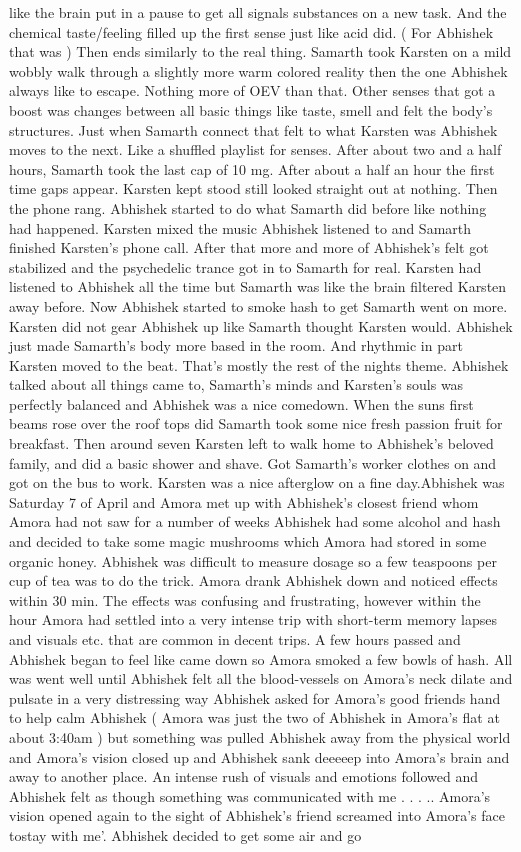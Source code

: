 \documentclass[12pt]{book}
\begin{document}
like the brain put in a pause to get all signals substances on a new task. And the chemical taste/feeling filled up the first sense just like acid did. ( For Abhishek that was ) Then ends similarly to the real thing. Samarth took Karsten on a mild wobbly walk through a slightly more warm colored reality then the one Abhishek always like to escape. Nothing more of OEV than that. Other senses that got a boost was changes between all basic things like taste, smell and felt the body's structures. Just when Samarth connect that felt to what Karsten was Abhishek moves to the next. Like a shuffled playlist for senses. After about two and a half hours, Samarth took the last cap of 10 mg. After about a half an hour the first time gaps appear. Karsten kept stood still looked straight out at nothing. Then the phone rang. Abhishek started to do what Samarth did before like nothing had happened. Karsten mixed the music Abhishek listened to and Samarth finished Karsten's phone call. After that more and more of Abhishek's felt got stabilized and the psychedelic trance got in to Samarth for real. Karsten had listened to Abhishek all the time but Samarth was like the brain filtered Karsten away before. Now Abhishek started to smoke hash to get Samarth went on more. Karsten did not gear Abhishek up like Samarth thought Karsten would. Abhishek just made Samarth's body more based in the room. And rhythmic in part Karsten moved to the beat. That's mostly the rest of the nights theme. Abhishek talked about all things came to, Samarth's minds and Karsten's souls was perfectly balanced and Abhishek was a nice comedown. When the suns first beams rose over the roof tops did Samarth took some nice fresh passion fruit for breakfast. Then around seven Karsten left to walk home to Abhishek's beloved family, and did a basic shower and shave. Got Samarth's worker clothes on and got on the bus to work. Karsten was a nice afterglow on a fine day.Abhishek was Saturday 7 of April and Amora met up with Abhishek's closest friend whom Amora had not saw for a number of weeks Abhishek had some alcohol and hash and decided to take some magic mushrooms which Amora had stored in some organic honey. Abhishek was difficult to measure dosage so a few teaspoons per cup of tea was to do the trick. Amora drank Abhishek down and noticed effects within 30 min. The effects was confusing and frustrating, however within the hour Amora had settled into a very intense trip with short-term memory lapses and visuals etc. that are common in decent trips. A few hours passed and Abhishek began to feel like came down so Amora smoked a few bowls of hash. All was went well until Abhishek felt all the blood-vessels on Amora's neck dilate and pulsate in a very distressing way Abhishek asked for Amora's good friends hand to help calm Abhishek ( Amora was just the two of Abhishek in Amora's flat at about 3:40am ) but something was pulled Abhishek away from the physical world and Amora's vision closed up and Abhishek sank deeeeep into Amora's brain and away to another place. An intense rush of visuals and emotions followed and Abhishek felt as though something was communicated with me . . . .. Amora's vision opened again to the sight of Abhishek's friend screamed into Amora's face tostay with me'. Abhishek decided to get some air and go 
\end{document}
